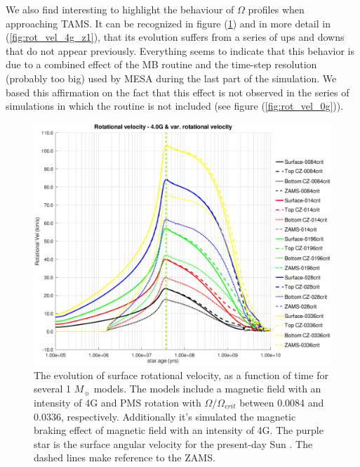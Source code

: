 \documentclass[fleqn,usenatbib]{mnras}
\begin{document}
We also find interesting to highlight the behaviour of $\Omega$ profiles when approaching TAMS. It can be recognized in figure (\ref{fig:rot_vel_4g}) and in more detail in (\ref{fig:rot_vel_4g_z1}), that its evolution suffers from a series of ups and downs that do not appear previously. Everything seems to indicate that this behavior is due to a combined effect of the MB routine and the time-step resolution (probably too big) used by MESA during the last part of the simulation. We based this affirmation on the fact that this effect is not observed in the series of simulations in which the routine is not included (see figure (\ref{fig:rot_vel_0g})).\par

\begin{figure}
	\includegraphics[trim = 30mm 15mm 20mm 15mm, clip,width=\columnwidth]{figures/rot_vel_var_vel_4_0g.eps}
    \caption{The evolution of surface rotational velocity, as a function of time for several 1 $M_{\sun}$ models. The models include a magnetic field with an intensity of 4G and PMS rotation with $\Omega / \Omega_{crit}$ between 0.0084 and 0.0336, respectively. Additionally it's simulated the magnetic braking effect of magnetic field with an intensity of 4G. The purple star is the surface angular velocity for the present-day Sun \citep{Gill2012}. The dashed lines make reference to the ZAMS.}
    \label{fig:rot_vel_4g}
\end{figure}
\end{document}
